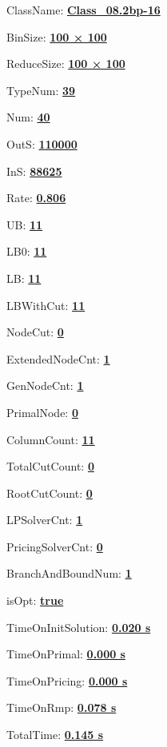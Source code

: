 \documentclass[11pt]{article}
\begin{document}
\pagestyle{empty}


ClassName: \underline{\textbf{Class_08.2bp-16}}
\par
BinSize: \underline{\textbf{100 × 100}}
\par
ReduceSize: \underline{\textbf{100 × 100}}
\par
TypeNum: \underline{\textbf{39}}
\par
Num: \underline{\textbf{40}}
\par
OutS: \underline{\textbf{110000}}
\par
InS: \underline{\textbf{88625}}
\par
Rate: \underline{\textbf{0.806}}
\par
UB: \underline{\textbf{11}}
\par
LB0: \underline{\textbf{11}}
\par
LB: \underline{\textbf{11}}
\par
LBWithCut: \underline{\textbf{11}}
\par
NodeCut: \underline{\textbf{0}}
\par
ExtendedNodeCnt: \underline{\textbf{1}}
\par
GenNodeCnt: \underline{\textbf{1}}
\par
PrimalNode: \underline{\textbf{0}}
\par
ColumnCount: \underline{\textbf{11}}
\par
TotalCutCount: \underline{\textbf{0}}
\par
RootCutCount: \underline{\textbf{0}}
\par
LPSolverCnt: \underline{\textbf{1}}
\par
PricingSolverCnt: \underline{\textbf{0}}
\par
BranchAndBoundNum: \underline{\textbf{1}}
\par
isOpt: \underline{\textbf{true}}
\par
TimeOnInitSolution: \underline{\textbf{0.020 s}}
\par
TimeOnPrimal: \underline{\textbf{0.000 s}}
\par
TimeOnPricing: \underline{\textbf{0.000 s}}
\par
TimeOnRmp: \underline{\textbf{0.078 s}}
\par
TotalTime: \underline{\textbf{0.145 s}}
\par
\newpage


\end{document}
